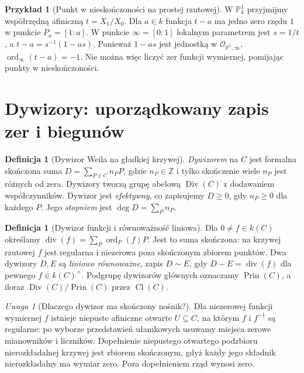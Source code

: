 \documentclass[11pt,a4paper,openany]{report}
\numberwithin{equation}{section}
\theoremstyle{plain}
\theoremstyle{definition}
\newtheorem{definicja}[twierdzenie]{Definicja}
\newtheorem{przyklad}[twierdzenie]{Przykład}
\theoremstyle{remark}
\newtheorem{uwaga}[twierdzenie]{Uwaga}
\newcommand{\Z}{\mathbb Z}
\newcommand{\PP}{\mathbb P}
\begin{document}
\begin{przyklad}[Punkt w nieskończoności na prostej rzutowej]
W $\PP^1_k$ przyjmijmy współrzędną afiniczną
$t=X_1/X_0$. Dla $a\in k$ funkcja $t-a$ ma
jedno zero rzędu $1$ w punkcie $P_a=[1:a]$.
W punkcie $\infty=[0:1]$ lokalnym parametrem jest
$s=1/t$, a $t-a=s^{-1}(1-as)$.
Ponieważ $1-as$ jest jednostką w $\mathcal O_{\PP^1,\infty}$,
$\operatorname{ord}_\infty(t-a)=-1$.
Nie można więc liczyć zer funkcji wymiernej,
pomijając punkty w nieskończoności.
\end{przyklad}

\section{Dywizory: uporządkowany zapis zer i biegunów}
\label{sec:divisors}

\begin{definicja}[Dywizor Weila na gładkiej krzywej]
\emph{Dywizorem} na $C$ jest formalna skończona suma
$D=\sum_{P\in C}n_P P$, gdzie $n_P\in\Z$
i tylko skończenie wiele $n_P$ jest różnych od zera.
Dywizory tworzą grupę abelową $\operatorname{Div}(C)$
z dodawaniem współczynników. Dywizor jest
\emph{efektywny}, co zapisujemy $D\ge0$,
gdy $n_P\ge0$ dla każdego $P$.
Jego \emph{stopniem} jest $\deg D=\sum_Pn_P$.
\end{definicja}

\begin{definicja}[Dywizor funkcji i równoważność liniowa]
Dla $0\ne f\in k(C)$ określamy
$\operatorname{div}(f)=\sum_P\operatorname{ord}_P(f)P$.
Jest to suma skończona: na krzywej rzutowej
$f$ jest regularna i niezerowa poza skończonym
zbiorem punktów. Dwa dywizory $D,E$ są
\emph{liniowo równoważne}, zapis $D\sim E$,
gdy $D-E=\operatorname{div}(f)$ dla pewnego
$f\in k(C)^\times$. Podgrupę dywizorów głównych
oznaczamy $\operatorname{Prin}(C)$, a iloraz
$\operatorname{Div}(C)/\operatorname{Prin}(C)$
przez $\operatorname{Cl}(C)$.
\end{definicja}

\begin{uwaga}[Dlaczego dywizor ma skończony nośnik?]
Dla niezerowej funkcji wymiernej $f$ istnieje niepuste
afiniczne otwarte $U\subseteq C$, na którym $f$
i $f^{-1}$ są regularne: po wyborze przedstawień
ułamkowych usuwamy miejsca zerowe mianowników
i liczników. Dopełnienie niepustego otwartego
podzbioru nierozkładalnej krzywej jest zbiorem
skończonym, gdyż każdy jego składnik nierozkładalny
ma wymiar zero. Poza dopełnieniem rząd wynosi zero.
\end{uwaga}
\end{document}
